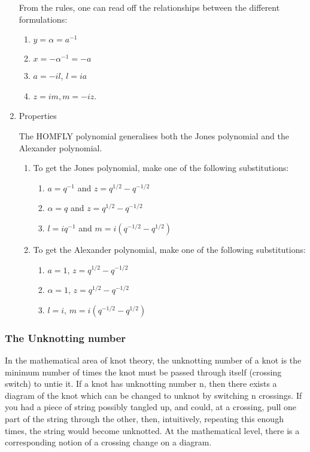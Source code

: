\documentclass[lang=cn]{elegantpaper}
\begin{document}
\begin{enumerate}
From the rules, one can read off the relationships between the different formulations:

\begin{enumerate}
\item \(y = \alpha = a^{-1}\)
\item \(x = - \alpha^{-1} = -a\)
\item \(a = - i l\), \(l = i a\)
\item \(z = i m, m = - i z\).
\end{enumerate}


\item Properties
\label{sec:orgb0817dd}

The HOMFLY polynomial generalises both the Jones polynomial and the Alexander polynomial.

\begin{enumerate}
\item To get the Jones polynomial, make one of the following substitutions:
\label{sec:orge7dcbb2}

\begin{enumerate}
\item \(a = q^{-1}\) and \(z = q^{1/2} - q^{-1/2}\)
\item \(\alpha = q\) and \(z = q^{1/2} - q^{-1/2}\)
\item \(l = i q^{-1}\) and \(m = i (q^{-1/2} - q^{1/2})\)
\end{enumerate}

\item To get the Alexander polynomial, make one of the following substitutions:
\label{sec:orgcee9fe8}

\begin{enumerate}
\item \(a = 1\), \(z = q^{1/2} - q^{-1/2}\)
\item \(\alpha = 1\), \(z = q^{1/2} - q^{-1/2}\)
\item \(l = i\), \(m = i (q^{-1/2} - q^{1/2})\)
\end{enumerate}
\end{enumerate}
\end{enumerate}
\subsubsection{The Unknotting number}
\label{sec:org179c1e7}
In the mathematical area of knot theory, the unknotting number of a knot is the minimum number of times the knot must be passed through itself (crossing switch) to untie it. If a knot has unknotting number n, then there exists a diagram of the knot which can be changed to unknot by switching n crossings.
If you had a piece of string possibly tangled up, and could, at a crossing, pull one part of the string through the other, then, intuitively, repeating this enough times, the string would become unknotted. At the mathematical level, there is a corresponding notion of a crossing change on a diagram.
\end{document}
